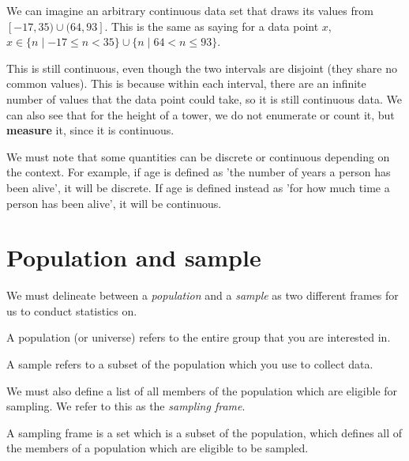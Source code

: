 We can imagine an arbitrary continuous data set that draws its values from $[-17, 35) \cup (64, 93]$. This is the same as saying for a data point $x$, $x \in \{ n \mid -17 \leq n < 35\} \cup \{ n \mid 64 < n \leq 93 \}$. 

This is still continuous, even though the two intervals are disjoint (they share no common values). This is because within each interval, there are an infinite number of values that the data point could take, so it is still continuous data. We can also see that for the height of a tower, we do not enumerate or count it, but \textbf{measure} it, since it is continuous.

\begin{tcolorbox}
    \begin{remark}[Important!]
       We must note that some quantities can be discrete or continuous depending on the context. For example, if age is defined as 'the number of years a person has been alive', it will be discrete. If age is defined instead as 'for how much time a person has been alive', it will be continuous. 
    \end{remark}
\end{tcolorbox}

\section{Population and sample}

We must delineate between a \textit{population} and a \textit{sample} as two different frames for us to conduct statistics on.

\begin{tcolorbox}
    \begin{definition}[Population]
        A population (or universe) refers to the entire group that you are interested in.
    \end{definition}
\end{tcolorbox}

\begin{tcolorbox}
    \begin{definition}[Sample]
        A sample refers to a subset of the population which you use to collect data.
    \end{definition}
\end{tcolorbox}

We must also define a list of all members of the population which are eligible for sampling. We refer to this as the \textit{sampling frame}.

\begin{tcolorbox}
    \begin{definition}
        A sampling frame is a set which is a subset of the population, which defines all of the members of a population which are eligible to be sampled.
    \end{definition}
\end{tcolorbox}

